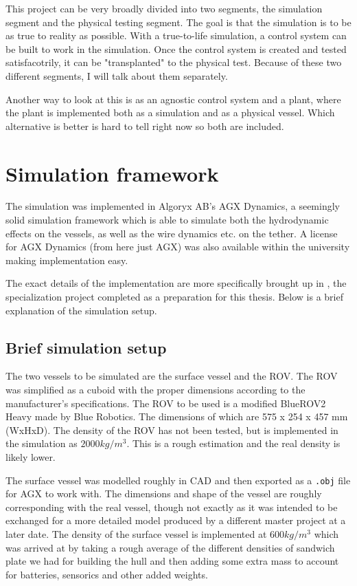 \documentclass[class=article, crop=false]{standalone}
\begin{document}
This project can be very broadly divided into two segments, the simulation segment and the physical testing segment. The goal is that the simulation is to be as true to reality as possible. With a true-to-life simulation, a control system can be built to work in the simulation. Once the control system is created and tested satisfacotrily, it can be "transplanted" to the physical test. Because of these two different segments, I will talk about them separately.

Another way to look at this is as an agnostic control system and a plant, where the plant is implemented both as a simulation and as a physical vessel. Which alternative is better is hard to tell right now so both are included.
\section{Simulation framework}
The simulation was implemented in Algoryx AB's AGX Dynamics, a seemingly solid simulation framework which is able to simulate both the hydrodynamic effects on the vessels, as well as the wire dynamics etc. on the tether. A license for AGX Dynamics (from here just AGX) was also available within the university making implementation easy.

The exact details of the implementation are more specifically brought up in \citet{specialization}, the specialization project completed as a preparation for this thesis. Below is a brief explanation of the simulation setup.

\subsection{Brief simulation setup}
The two vessels to be simulated are the surface vessel and the ROV. The ROV was simplified as a cuboid with the proper dimensions according to the manufacturer's specifications. The ROV to be used is a modified BlueROV2 Heavy made by Blue Robotics. The dimensions of which are 575 x 254 x 457 mm (WxHxD). The density of the ROV has not been tested, but is implemented in the simulation as \(2000kg/m^3\). This is a rough estimation and the real density is likely lower.

The surface vessel was modelled roughly in CAD and then exported as a \texttt{.obj} file for AGX to work with. The dimensions and shape of the vessel are roughly corresponding with the real vessel, though not exactly as it was intended to be exchanged for a more detailed model produced by a different master project at a later date. The density of the surface vessel is implemented at \(600kg/m^3\) which was arrived at by taking a rough average of the different densities of sandwich plate we had for building the hull and then adding some extra mass to account for batteries, sensorics and other added weights.
\end{document}
